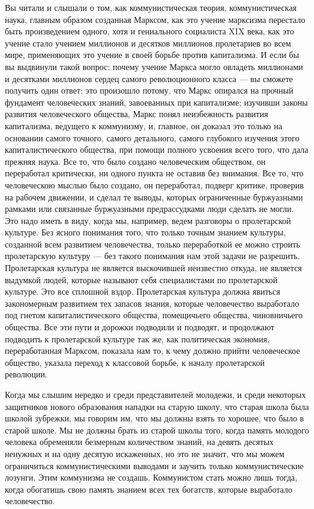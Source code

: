 \documentclass[12pt]{article}
\newcommand{\parnum}{(\arabic{parcount})}
\newcounter{parcount}
\newenvironment{parnumbers}{%
  \par%
  \everypar{\noindent \stepcounter{parcount}\marginpar[]{\parnum}}%
}{}
\begin{document}
\begin{parnumbers}
Вы читали и слышали о том, как коммунистическая теория, коммунистическая наука, главным образом созданная Марксом, как это учение марксизма перестало быть произведением одного, хотя и гениального социалиста XIX века, как это учение стало учением миллионов и десятков миллионов пролетариев во всем мире, применяющих это учение в своей борьбе против капитализма. И если бы вы выдвинули такой вопрос: почему учение Маркса могло овладеть миллионами и десятками миллионов сердец самого революционного класса — вы сможете получить один ответ: это произошло потому, что Маркс опирался на прочный фундамент человеческих знаний, завоеванных при капитализме; изучивши законы развития человеческого общества, Маркс понял неизбежность развития капитализма, ведущего к коммунизму, и, главное, он доказал это только на основании самого точного, самого детального, самого глубокого изучения этого капиталистического общества, при помощи полного усвоения всего того, что дала прежняя наука. Все то, что было создано человеческим обществом, он переработал критически, ни одного пункта не оставив без внимания. Все то, что человеческою мыслью было создано, он переработал, подверг критике, проверив на рабочем движении, и сделал те выводы, которых ограниченные буржуазными рамками или связанные буржуазными предрассудками люди сделать не могли. Это надо иметь в виду, когда мы, например, ведем разговоры о пролетарской культуре. Без ясного понимания того, что только точным знанием культуры, созданной всем развитием человечества, только переработкой ее можно строить пролетарскую культуру — без такого понимания нам этой задачи не разрешить. Пролетарская культура не является выскочившей неизвестно откуда, не является выдумкой людей, которые называют себя специалистами по пролетарской культуре. Это все сплошной вздор. Пролетарская культура должна явиться закономерным развитием тех запасов знания, которые человечество выработало под гнетом капиталистического общества, помещичьего общества, чиновничьего общества. Все эти пути и дорожки подводили и подводят, и продолжают подводить к пролетарской культуре так же, как политическая экономия, переработанная Марксом, показала нам то, к чему должно прийти человеческое общество, указала переход к классовой борьбе, к началу пролетарской революции.

Когда мы слышим нередко и среди представителей молодежи, и среди некоторых защитников нового образования нападки на старую школу, что старая школа была школой зубрежки, мы говорим им, что мы должны взять то хорошее, что было в старой школе. Мы не должны брать из старой школы того, когда память молодого человека обременяли безмерным количеством знаний, на девять десятых ненужных и на одну десятую искаженных, но это не значит, что мы можем ограничиться коммунистическими выводами и заучить только коммунистические лозунги. Этим коммунизма не создашь. Коммунистом стать можно лишь тогда, когда обогатишь свою память знанием всех тех богатств, которые выработало человечество.


\end{parnumbers}
\end{document}
